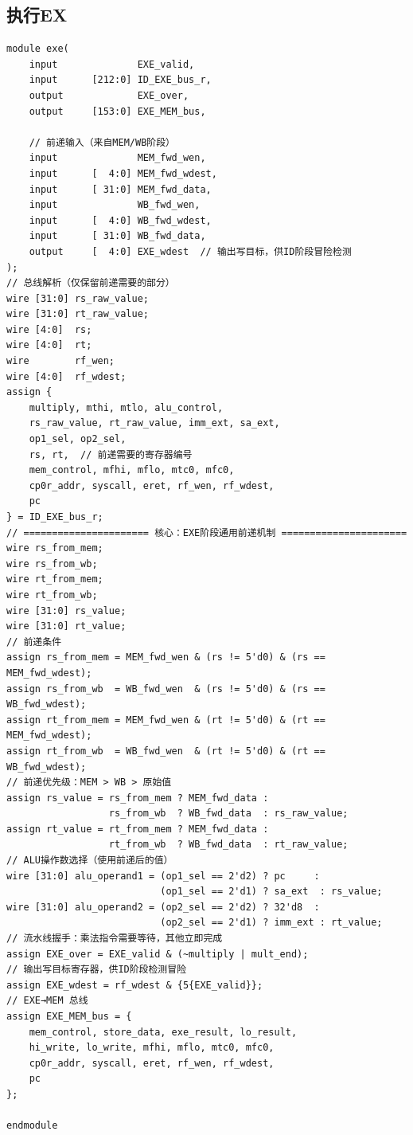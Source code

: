 ﻿\documentclass{article}
\begin{document}
\subsection{执行\textbf{EX}}
\begin{verbatim}
module exe(
    input              EXE_valid,
    input      [212:0] ID_EXE_bus_r,
    output             EXE_over,
    output     [153:0] EXE_MEM_bus,

    // 前递输入（来自MEM/WB阶段）
    input              MEM_fwd_wen,
    input      [  4:0] MEM_fwd_wdest,
    input      [ 31:0] MEM_fwd_data,
    input              WB_fwd_wen,
    input      [  4:0] WB_fwd_wdest,
    input      [ 31:0] WB_fwd_data,
    output     [  4:0] EXE_wdest  // 输出写目标，供ID阶段冒险检测
);
// 总线解析（仅保留前递需要的部分）
wire [31:0] rs_raw_value;
wire [31:0] rt_raw_value;
wire [4:0]  rs;
wire [4:0]  rt;
wire        rf_wen;
wire [4:0]  rf_wdest;
assign {
    multiply, mthi, mtlo, alu_control,
    rs_raw_value, rt_raw_value, imm_ext, sa_ext,
    op1_sel, op2_sel,
    rs, rt,  // 前递需要的寄存器编号
    mem_control, mfhi, mflo, mtc0, mfc0,
    cp0r_addr, syscall, eret, rf_wen, rf_wdest,
    pc
} = ID_EXE_bus_r;
// ====================== 核心：EXE阶段通用前递机制 ======================
wire rs_from_mem;
wire rs_from_wb;
wire rt_from_mem;
wire rt_from_wb;
wire [31:0] rs_value;
wire [31:0] rt_value;
// 前递条件
assign rs_from_mem = MEM_fwd_wen & (rs != 5'd0) & (rs == MEM_fwd_wdest);
assign rs_from_wb  = WB_fwd_wen  & (rs != 5'd0) & (rs == WB_fwd_wdest);
assign rt_from_mem = MEM_fwd_wen & (rt != 5'd0) & (rt == MEM_fwd_wdest);
assign rt_from_wb  = WB_fwd_wen  & (rt != 5'd0) & (rt == WB_fwd_wdest);
// 前递优先级：MEM > WB > 原始值
assign rs_value = rs_from_mem ? MEM_fwd_data :
                  rs_from_wb  ? WB_fwd_data  : rs_raw_value;
assign rt_value = rt_from_mem ? MEM_fwd_data :
                  rt_from_wb  ? WB_fwd_data  : rt_raw_value;
// ALU操作数选择（使用前递后的值）
wire [31:0] alu_operand1 = (op1_sel == 2'd2) ? pc     :
                           (op1_sel == 2'd1) ? sa_ext  : rs_value;
wire [31:0] alu_operand2 = (op2_sel == 2'd2) ? 32'd8  :
                           (op2_sel == 2'd1) ? imm_ext : rt_value;
// 流水线握手：乘法指令需要等待，其他立即完成
assign EXE_over = EXE_valid & (~multiply | mult_end);
// 输出写目标寄存器，供ID阶段检测冒险
assign EXE_wdest = rf_wdest & {5{EXE_valid}};
// EXE→MEM 总线
assign EXE_MEM_bus = {
    mem_control, store_data, exe_result, lo_result,
    hi_write, lo_write, mfhi, mflo, mtc0, mfc0,
    cp0r_addr, syscall, eret, rf_wen, rf_wdest,
    pc
};

endmodule
\end{verbatim}
\end{document}
